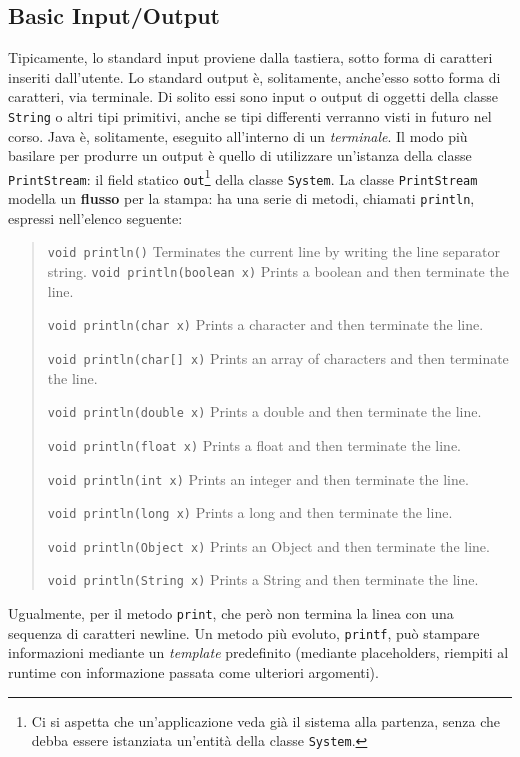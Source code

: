 \documentclass[\fontsizeclass,twocolumn]{\classname}
\theoremstyle{definition}
\theoremstyle{definition}
\begin{document}
\subsection{Basic Input/Output}

Tipicamente, lo standard input proviene dalla tastiera, sotto forma di caratteri
inseriti dall'utente. Lo standard output è, solitamente, anche'esso sotto forma
di caratteri, via terminale. Di solito essi sono input o output di oggetti
della classe \texttt{String} o altri tipi primitivi, anche se tipi differenti
verranno visti in futuro nel corso. Java è, solitamente, eseguito all'interno di
un \emph{terminale}. Il modo più basilare per produrre un output è quello di
utilizzare un'istanza della classe \texttt{PrintStream}: il field statico
\texttt{out}\footnote{Ci si aspetta che un'applicazione veda già il sistema
alla partenza, senza che debba essere istanziata un'entità della classe
\texttt{System}.} della classe \texttt{System}. La classe \texttt{PrintStream}
modella un \textbf{flusso} per la stampa: ha una serie di metodi, chiamati
\texttt{println}, espressi nell'elenco seguente:
\begin{quote}
\footnotesize{\texttt{void 	println()}	Terminates the current line by writing the line separator string.
\texttt{void 	println(boolean x)} 	Prints a boolean and then terminate the line.

\texttt{void 	println(char x)} 	Prints a character and then terminate the line.

\texttt{void 	println(char[] x)} 	Prints an array of characters and then terminate the line.

\texttt{void 	println(double x)} 	Prints a double and then terminate the line.

\texttt{void 	println(float x)} 	Prints a float and then terminate the line.

\texttt{void 	println(int x)} 	Prints an integer and then terminate the line.

\texttt{void 	println(long x)} 	Prints a long and then terminate the line.

\texttt{void 	println(Object x)} 	Prints an Object and then terminate the line.

\texttt{void 	println(String x)} 	Prints a String and then terminate the line.}
\end{quote}

Ugualmente, per il metodo \texttt{print}, che però non termina la linea con una
sequenza di caratteri newline. Un metodo più evoluto, \texttt{printf}, può
stampare informazioni mediante un \emph{template} predefinito (mediante
placeholders, riempiti al runtime con informazione passata come ulteriori
argomenti).
\end{document}
